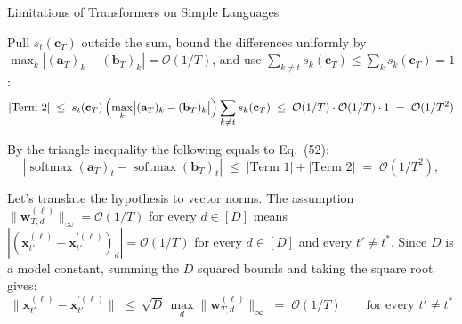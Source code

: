 \begin{question}{Limitations of Transformers on Simple Languages}
\begin{subquestion}
    Pull $s_t(\mathbf{c}_T)$ outside the sum, bound the differences uniformly by $\max_k |(\mathbf{a}_T)_k - (\mathbf{b}_T)_k| = \mathcal{O}(1/T)$, and use $\sum_{k \ne t} s_k(\mathbf{c}_T) \le \sum_k s_k(\mathbf{c}_T) = 1$:
    \begin{equation*}
        |\text{Term 2}| \;\le\; s_t(\mathbf{c}_T)\,\Bigl(\max_k \bigl|(\mathbf{a}_T)_k - (\mathbf{b}_T)_k\bigr|\Bigr)\sum_{k \ne t} s_k(\mathbf{c}_T)
        \;\le\; \mathcal{O}(1/T) \cdot \mathcal{O}(1/T) \cdot 1 \;=\; \mathcal{O}(1/T^{2})
    \end{equation*}

    By the triangle inequality the following equals to Eq.~(52):
    \begin{equation*}
        |\operatorname{softmax}(\mathbf{a}_T)_t - \operatorname{softmax}(\mathbf{b}_T)_t| \;\le\; |\text{Term 1}| + |\text{Term 2}| \;=\; \mathcal{O}(1/T^{2}),
    \end{equation*}
\end{subquestion}

\begin{subquestion}
    Let's translate the hypothesis to vector norms.
    The assumption $\|\mathbf{w}_{T,d}^{(\ell)}\|_{\infty} = \mathcal{O}(1/T)$ for every $d \in [D]$ means $|(\mathbf{x}_{t'}^{(\ell)} - \mathbf{x}_{t'}^{\prime(\ell)})_d| = \mathcal{O}(1/T)$ for every $d \in [D]$ and every $t' \ne t^*$. 
    Since $D$ is a model constant, summing the $D$ squared bounds and taking the square root gives:
    \begin{equation*}
        \|\mathbf{x}_{t'}^{(\ell)} - \mathbf{x}_{t'}^{\prime(\ell)}\| \;\le\; \sqrt{D}\, \max_d \|\mathbf{w}_{T,d}^{(\ell)}\|_{\infty} \;=\; \mathcal{O}(1/T) \qquad \text{for every } t' \ne t^*
    \end{equation*}


\end{subquestion}
\end{question}
